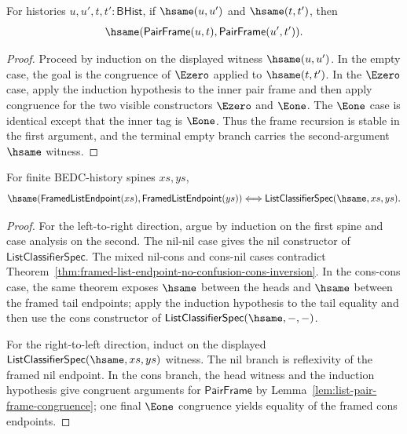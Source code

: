 \begin{lemma}
\label{lem:list-pair-frame-congruence}
For histories $u,u',t,t':\mathsf{BHist}$, if $\hsame(u,u')$ and
$\hsame(t,t')$, then
$$
\hsame(\mathsf{PairFrame}(u,t),\mathsf{PairFrame}(u',t')).
$$
\end{lemma}
\begin{proof}
Proceed by induction on the displayed witness $\hsame(u,u')$. In the empty
case, the goal is the congruence of $\Ezero$ applied to $\hsame(t,t')$. In the
$\Ezero$ case, apply the induction hypothesis to the inner pair frame and then
apply congruence for the two visible constructors $\Ezero$ and $\Eone$. The
$\Eone$ case is identical except that the inner tag is $\Eone$. Thus the frame
recursion is stable in the first argument, and the terminal empty branch carries
the second-argument $\hsame$ witness.
\end{proof}

\begin{theorem}
\label{thm:framed-list-endpoint-classifier-exactness}
For finite BEDC-history spines $xs,ys$,
$$
\hsame(\mathsf{FramedListEndpoint}(xs),\mathsf{FramedListEndpoint}(ys))
\Longleftrightarrow
\mathsf{ListClassifierSpec}(\hsame,xs,ys).
$$
\end{theorem}
\begin{proof}
For the left-to-right direction, argue by induction on the first spine and
case analysis on the second. The nil-nil case gives the nil constructor of
$\mathsf{ListClassifierSpec}$. The mixed nil-cons and cons-nil cases contradict
Theorem~\ref{thm:framed-list-endpoint-no-confusion-cons-inversion}. In the
cons-cons case, the same theorem exposes $\hsame$ between the heads and
$\hsame$ between the framed tail endpoints; apply the induction hypothesis to
the tail equality and then use the cons constructor of
$\mathsf{ListClassifierSpec}(\hsame,-,-)$.

For the right-to-left direction, induct on the displayed
$\mathsf{ListClassifierSpec}(\hsame,xs,ys)$ witness. The nil branch is
reflexivity of the framed nil endpoint. In the cons branch, the head witness and
the induction hypothesis give congruent arguments for
$\mathsf{PairFrame}$ by Lemma~\ref{lem:list-pair-frame-congruence}; one final
$\Eone$ congruence yields equality of the framed cons endpoints.
\end{proof}

